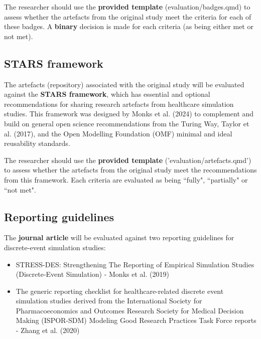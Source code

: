 The researcher should use the \textbf{provided template} (evaluation/badges.qmd)\autocite{heather_template_2024} to assess whether the artefacts from the original study meet the criteria for each of these badges. A \textbf{binary} decision is made for each criteria (as being either met or not met).

\vspace{0.5cm}
\subsection{STARS framework}

The artefacts (repository) associated with the original study will be evaluated against the \textbf{STARS framework}, which has essential and optional recommendations for sharing research artefacts from healthcare simulation studies. This framework was designed by Monks et al. (2024)\autocite{monks_towards_2024} to complement and build on general open science recommendations from the Turing Way,\autocite{the_turing_way_community_turing_2022} Taylor et al. (2017),\autocite{taylor_open_2017} and the Open Modelling Foundation (OMF) minimal and ideal reusability standards.\autocite{the_open_modeling_foundation_omf_reusability_2024}

The researcher should use the \textbf{provided template} ('evaluation/artefacts.qmd')\autocite{heather_template_2024} to assess whether the artefacts from the original study meet the recommendations from this framework. Each criteria are evaluated as being ``fully", ``partially" or ``not met".

\vspace{0.5cm}
\subsection{Reporting guidelines} \label{sec:reporting}

The \textbf{journal article} will be evaluated against two reporting guidelines for discrete-event simulation studies:
\begin{itemize}
    \item STRESS-DES: Strengthening The Reporting of Empirical Simulation Studies (Discrete-Event Simulation) - Monks et al. (2019)\autocite{monks_strengthening_2019}
    \item The generic reporting checklist for healthcare-related discrete event simulation studies derived from the International Society for Pharmacoeconomics and Outcomes Research Society for Medical Decision Making (ISPOR-SDM) Modeling Good Research Practices Task Force reports - Zhang et al. (2020)\autocite{zhang_reporting_2020}
\end{itemize}

